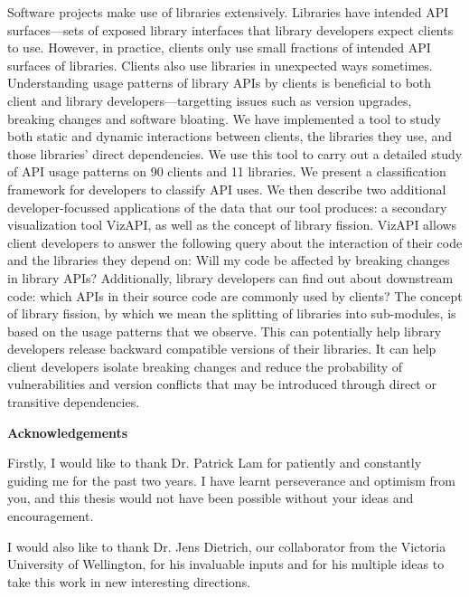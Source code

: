 Software projects make use of libraries extensively. Libraries have intended API surfaces—sets of exposed library interfaces that library developers expect clients to use. However, in practice, clients only use small fractions of intended API surfaces of libraries. Clients also use libraries in unexpected ways sometimes. Understanding usage patterns of library APIs by clients is beneficial to both client and library developers—targetting issues such as version upgrades, breaking changes and software bloating. We have implemented a tool to study both static and dynamic interactions between clients, the libraries they use, and those libraries’ direct dependencies. We use this tool to carry out a detailed study of API usage patterns on 90 clients and 11 libraries. We present a classification framework for developers to classify API uses. We then describe two additional developer-focussed applications of the data that our tool produces: a secondary visualization tool VizAPI, as well as the concept of library fission. VizAPI allows client developers to answer the following query about the interaction of their code and the libraries they depend on: Will my code be affected by breaking changes in library APIs? Additionally, library developers can find out about downstream code: which APIs in their source code are commonly used by clients? The concept of library fission, by which we mean the splitting of libraries into sub-modules, is based on the usage patterns that we observe. This can potentially help library developers release backward compatible versions of their libraries. It can help client developers isolate breaking changes and reduce the probability of vulnerabilities and version conflicts that may be introduced through direct or transitive dependencies. 

\cleardoublepage


\begin{center}\textbf{Acknowledgements}\end{center}
Firstly, I would like to thank Dr. Patrick Lam for patiently and constantly guiding me for the past two years. I have learnt perseverance and optimism from you, and this thesis would not have been possible without your ideas and encouragement.

I would also like to thank Dr. Jens Dietrich, our collaborator from the Victoria University of Wellington, for his invaluable inputs and for his multiple ideas to take this work in new interesting directions.

